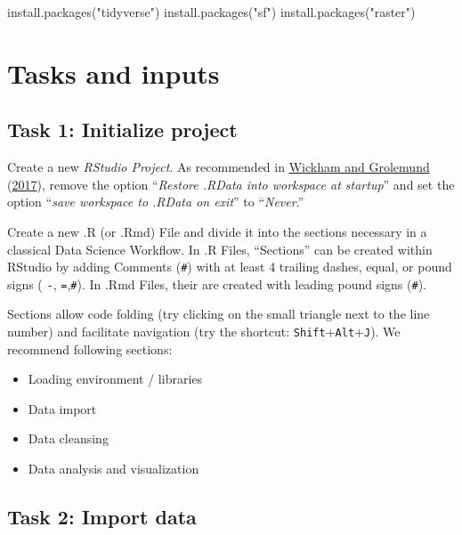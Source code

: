\documentclass[
]{book}
\newenvironment{Shaded}{\begin{snugshade}}{\end{snugshade}}
\newcommand{\FunctionTok}[1]{\textcolor[rgb]{0.00,0.00,0.00}{#1}}
\newcommand{\NormalTok}[1]{#1}
\newcommand{\StringTok}[1]{\textcolor[rgb]{0.31,0.60,0.02}{#1}}
\providecommand{\tightlist}{%
  \setlength{\itemsep}{0pt}\setlength{\parskip}{0pt}}
\begin{document}
\begin{Shaded}
\begin{Highlighting}[]
\FunctionTok{install.packages}\NormalTok{(}\StringTok{"tidyverse"}\NormalTok{)}
\FunctionTok{install.packages}\NormalTok{(}\StringTok{"sf"}\NormalTok{)}
\FunctionTok{install.packages}\NormalTok{(}\StringTok{"raster"}\NormalTok{)}
\end{Highlighting}
\end{Shaded}

\hypertarget{tasks-and-inputs}{%
\section{Tasks and inputs}\label{tasks-and-inputs}}

\hypertarget{task-1-initialize-project}{%
\subsection{Task 1: Initialize project}\label{task-1-initialize-project}}

Create a new \emph{RStudio Project}. As recommended in \protect\hyperlink{ref-wickham2017}{Wickham and Grolemund} (\protect\hyperlink{ref-wickham2017}{2017}), remove the option ``\emph{Restore .RData into workspace at startup}'' and set the option ``\emph{save workspace to .RData on exit}'' to ``\emph{Never}.''

Create a new .R (or .Rmd) File and divide it into the sections necessary in a classical Data Science Workflow. In .R Files, ``Sections'' can be created within RStudio by adding Comments (\texttt{\#}) with at least 4 trailing dashes, equal, or pound signs ( \texttt{-}, \texttt{=},\texttt{\#}). In .Rmd Files, their are created with leading pound signs (\texttt{\#}).

Sections allow code folding (try clicking on the small triangle next to the line number) and facilitate navigation (try the shortcut: \texttt{Shift}+\texttt{Alt}+\texttt{J}). We recommend following sections:

\begin{itemize}
\tightlist
\item
  Loading environment / libraries
\item
  Data import
\item
  Data cleansing
\item
  Data analysis and visualization
\end{itemize}

\hypertarget{task-2-import-data}{%
\subsection{Task 2: Import data}\label{task-2-import-data}}
\end{document}
